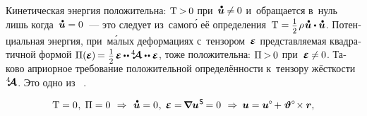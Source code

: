 \begin{otherlanguage}{russian}
\vspace{-0.1em} Кинетическая энергия положительна: ${\mathrm{T} \hspace{-0.2ex} > \hspace{-0.2ex} 0}$ при~${\mathdotabove{\bm{u}} \hspace{-0.1ex} \neq \hspace{-0.1ex} 0}$ и~обращается в~нуль лишь когда~${\mathdotabove{\bm{u}} = 0}$~--- это следует из~самог\'{о} её определения~${\mathrm{T} = \smalldisplaystyleonehalf \hspace{.2ex} \rho \hspace{0.2ex} \mathdotabove{\bm{u}} \dotp \mathdotabove{\bm{u}}}$. Потенциальная энергия, при~м\'{а}лых деформациях с~тензором~$\mathboldepsilon$ представляемая квадратичной формой
${\Pi(\hspace{-0.1ex}\mathboldepsilon\hspace{-0.1ex}) \hspace{-0.2ex}=\hspace{0.1ex} \smash{\smalldisplaystyleonehalf} \hspace{.25ex} \mathboldepsilon \hspace{-0.1ex} \dotdotp \hspace{-0.1ex} \stiffnesstensor \dotdotp \mathboldepsilon}$, тоже положительна: ${\Pi \hspace{-0.16ex} > \hspace{-0.2ex} 0}$ при~${\mathboldepsilon \hspace{-0.1ex} \neq \hspace{-0.1ex} 0}$. Таково априорное требование положительной определённости к~тензору жёсткости~$\hspace{.08ex}{^4\hspace{-0.72ex}\bm{\mathcal{A}}}\hspace{.08ex}$. Это одно из ~\cite{lurie-nonlinearelasticity, truesdell-firstcourse}.



\nopagebreak\vspace{-0.16em}\begin{equation*}
\mathrm{T} = 0 \hspace{.1ex}, \; \Pi = 0
\:\,\Rightarrow\,\:
\mathdotabove{\bm{u}} = 0 \hspace{.1ex}, \; \mathboldepsilon = \hspace{-0.25ex} \boldnabla {\bm{u}}^{\hspace{0.1ex}\mathsf{S}} \hspace{-0.2ex} = 0
\:\,\Rightarrow\:
\bm{u} = \bm{u}^{\hspace{-0.1ex}\circ} \hspace{-0.25ex} + \hspace{.1ex} \bm{\vartheta}^{\circ} \hspace{-0.4ex} \times \bm{r} ,
\end{equation*}


\end{otherlanguage}

